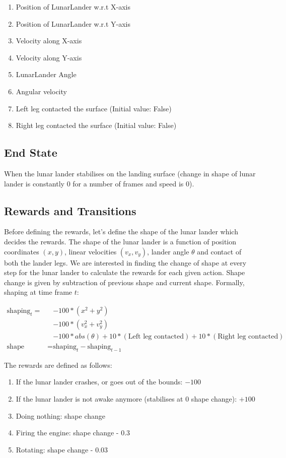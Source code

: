 \begin{enumerate}
\item Position of LunarLander w.r.t X-axis
\item Position of LunarLander w.r.t Y-axis
\item Velocity along X-axis 
\item Velocity along Y-axis
\item LunarLander Angle
\item Angular velocity 
\item Left leg contacted the surface (Initial value: False)
\item Right leg contacted the surface (Initial value: False)
\end{enumerate}

\subsection{End State}

When the lunar lander stabilises on the landing surface (change in shape of lunar lander is constantly 0 for a number of frames and speed is 0). 


\subsection{Rewards and Transitions}

Before defining the rewards, let's define the shape of the lunar lander which decides the rewards. The shape of the lunar lander is a function of position coordinates $(x, y)$, linear velocities $(v_x, v_y)$, lander angle $\theta$ and contact of both the lander legs. We are interested in finding the change of shape at every step for the lunar lander to calculate the rewards for each given action. Shape change is given by subtraction of previous shape and current shape. Formally, shaping at time frame $t$:

\begin{align*}
\text{shaping}_{t} = &- 100*(x^2 + y^2) \\
           & - 100*(v_x^2 + v_y^2) \\
            &- 100*abs(\theta) + 10*(\text{Left leg contacted}) + 10*(\text{Right leg contacted}) \\
\text{shape change} = & \text{shaping}_t - \text{shaping}_{t-1}
\end{align*}

The rewards are defined as follows:

\begin{enumerate}
\item If the lunar lander crashes, or goes out of the bounds: $-100$
\item If the lunar lander is not awake anymore (stabilises at 0 shape change): $+100$
\item Doing nothing: shape change 
\item Firing the engine: shape change - 0.3
\item Rotating: shape change - 0.03
\end{enumerate}


